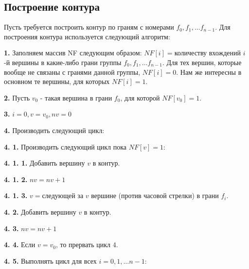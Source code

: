 \documentclass[a4paper,12pt, titlepage]{article}
\begin{document}
\subsection{Построение контура}
\begin{flushleft}
 Пусть требуется построить контур по граням с номерами $f_{0}, f_{1}, \ldots f_{n - 1}$. 
Для построения контура используется следующий алгоритм:
\end{flushleft}
\begin{flushleft}
 \textbf{1.} Заполняем массив NF следующим образом: $NF[i] = $количеству вхождений $i$-й вершины в какие-либо
грани группы $f_{0}, f_{1}, \ldots f_{n - 1}$. Для тех вершин, которые вообще не связаны с гранями данной группы, 
$NF[i] = 0$. Нам же интересны в основном те вершины, для которых $NF[i] = 1$.
\end{flushleft}
\begin{flushleft}
 \textbf{2.} Пусть $v_{0}$ - такая вершина в грани $f_{0}$, для которой $NF[v_{0}] = 1$.
\end{flushleft}
\begin{flushleft}
 \textbf{3.} $i = 0, v = v_{0}, nv = 0$
\end{flushleft}
\begin{flushleft}
 \textbf{4.} Производить следующий цикл:
\end{flushleft}
\begin{flushleft}
 \textbf{4. 1.} Производить следующий цикл пока $NF[v] = 1$:
\end{flushleft}
\begin{flushleft}
 \textbf{4. 1. 1.} Добавить вершину $v$ в контур.
\end{flushleft}
\begin{flushleft}
 \textbf{4. 1. 2.} $nv = nv + 1$
\end{flushleft}
\begin{flushleft}
 \textbf{4. 1. 3.} $v = $следующей за $v$ вершине (против часовой стрелки) в грани $f_{i}$.
\end{flushleft}
\begin{flushleft}
 \textbf{4. 2.} Добавить вершину $v$ в контур.
\end{flushleft} 
\begin{flushleft}
 \textbf{4. 3.} $nv = nv + 1$
\end{flushleft} 
\begin{flushleft}
 \textbf{4. 4.} Если $v = v_{0}$, то прервать цикл 4.
\end{flushleft} 
\begin{flushleft}
 \textbf{4. 5.} Выполнять цикл для всех $i = 0, 1, \ldots n - 1$:
\end{flushleft} 
\end{document}
